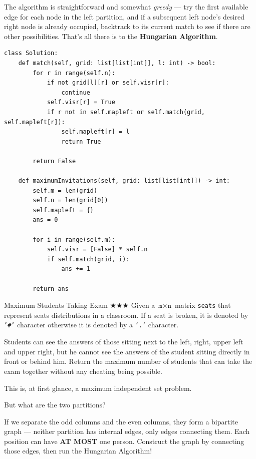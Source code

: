 \documentclass{article}
\begin{document}
The algorithm is straightforward and somewhat \emph{greedy} --- try the first available edge for each node in the left partition, and if a subsequent left node's desired right node is already occupied, backtrack to its current match to see if there are other possibilities. That's all there is to the \textbf{Hungarian Algorithm}.

\begin{lstlisting}[style=python]
class Solution:
    def match(self, grid: list[list[int]], l: int) -> bool:
        for r in range(self.n):
            if not grid[l][r] or self.visr[r]:
                continue
            self.visr[r] = True
            if r not in self.mapleft or self.match(grid, self.mapleft[r]):
                self.mapleft[r] = l
                return True
                
        return False

    def maximumInvitations(self, grid: list[list[int]]) -> int:
        self.m = len(grid)
        self.n = len(grid[0])
        self.mapleft = {}
        ans = 0
        
        for i in range(self.m):
            self.visr = [False] * self.n
            if self.match(grid, i):
                ans += 1
                
        return ans
\end{lstlisting}


\begin{Question}{Maximum Students Taking Exam $\bigstar\bigstar\bigstar$}
Given a $\texttt{m}\times\texttt{n}$ matrix \texttt{seats} that represent seats distributions in a classroom. If a seat is broken, it is denoted by \texttt{'\#'} character otherwise it is denoted by a \texttt{'.'} character.

Students can see the answers of those sitting next to the left, right, upper left and upper right, but he cannot see the answers of the student sitting directly in front or behind him. Return the maximum number of students that can take the exam together without any cheating being possible.
\end{Question}

This is, at first glance, a maximum independent set problem.

But what are the two partitions?

If we separate the odd columns and the even columns, they form a bipartite graph --- neither partition has internal edges, only edges connecting them. Each position can have \textbf{AT MOST} one person. Construct the graph by connecting those edges, then run the Hungarian Algorithm!
\end{document}
